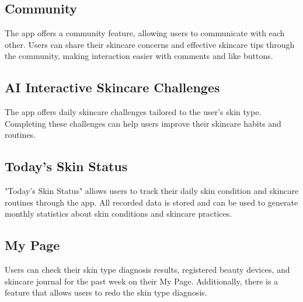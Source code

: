 \documentclass[conference]{IEEEtran}
\begin{document}
\subsection{Community}
The app offers a community feature, allowing users to communicate with each other. Users can share their skincare concerns and effective skincare tips through the community, making interaction easier with comments and like buttons. \\
\subsection{AI Interactive Skincare Challenges}
The app offers daily skincare challenges tailored to the user's skin type. Completing these challenges can help users improve their skincare habits and routines. \\
\subsection{Today's Skin Status}
"Today's Skin Status" allows users to track their daily skin condition and skincare routines through the app. All recorded data is stored and can be used to generate monthly statistics about skin conditions and skincare practices.\\
\subsection{My Page}
Users can check their skin type diagnosis results, registered beauty devices, and skincare journal for the past week on their My Page. Additionally, there is a feature that allows users to redo the skin type diagnosis.\\

 

\end{document}
